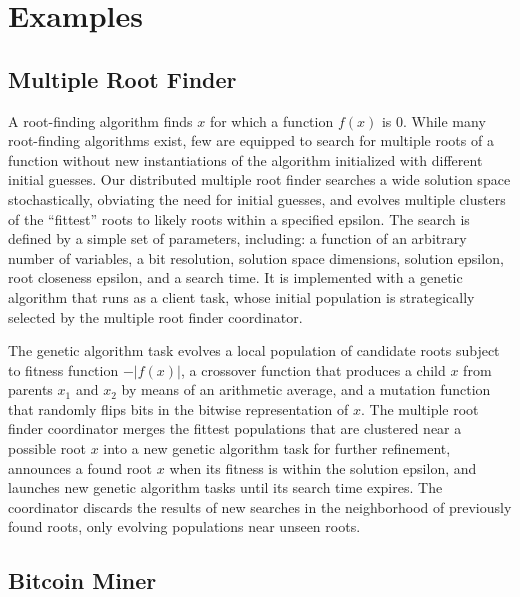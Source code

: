 \documentclass [11pt, twocolumn] {article}
\begin{document}
\section {Examples}

\subsection {Multiple Root Finder} 

\newcommand{\abs}[1]{\lvert{#1}\rvert}

A root-finding algorithm finds $x$ for which a function $f(x)$ is 0. While many root-finding algorithms exist, few are equipped to search for multiple roots of a function without new instantiations of the algorithm initialized with different initial guesses. Our distributed multiple root finder searches a wide solution space stochastically, obviating the need for initial guesses, and evolves multiple clusters of the ``fittest'' roots to likely roots within a specified epsilon. The search is defined by a simple set of parameters, including: a function of an arbitrary number of variables, a bit resolution, solution space dimensions, solution epsilon, root closeness epsilon, and a search time. It is implemented with a genetic algorithm that runs as a client task, whose initial population is strategically selected by the multiple root finder coordinator.

The genetic algorithm task evolves a local population of candidate roots subject to fitness function $-\abs{f(x)}$, a crossover function that produces a child $x$ from parents $x_1$ and $x_2$ by means of an arithmetic average, and a mutation function that randomly flips bits in the bitwise representation of $x$. The multiple root finder coordinator merges the fittest populations that are clustered near a possible root $x$ into a new genetic algorithm task for further refinement, announces a found root $x$ when its fitness is within the solution epsilon, and launches new genetic algorithm tasks until its search time expires. The coordinator discards the results of new searches in the neighborhood of previously found roots, only evolving populations near unseen roots.

\subsection {Bitcoin Miner}
\end{document}
